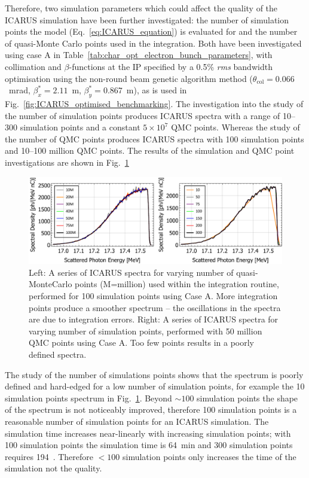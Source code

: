 \documentclass[../main.tex]{subfiles}
\begin{document}
Therefore, two simulation parameters which could affect the quality of the \textsc{ICARUS} simulation have been further investigated: the number of simulation points the model (Eq.~\ref{eq:ICARUS_equation}) is evaluated for and the number of quasi-Monte Carlo points used in the integration. Both have been investigated using case A  in Table~\ref{tab:char_opt_electron_bunch_parameters}, with collimation and $\beta$-functions at the IP specified by a 0.5\% \textit{rms} bandwidth optimisation using the non-round beam genetic algorithm method ($\theta_{\mathrm{col}}=0.066$~\si{\milli\radian}, $\beta_{x}^{*}=2.11$~\si{\meter}, $\beta_{y}^{*}=0.867$~\si{\meter}), as is used in Fig.~\ref{fig:ICARUS_optimised_benchmarking}. The investigation into the study of the number of simulation points produces \textsc{ICARUS} spectra with a range of 10--300 simulation points and a constant $5\times 10^{7}$ QMC points. Whereas the study of the number of QMC points produces \textsc{ICARUS} spectra with 100 simulation points and 10--100 million QMC points. The results of the simulation and QMC point investigations are shown in Fig.~\ref{fig:ICARUS_sim_qmc_points}

\begin{figure}[!h]
\centering
\includegraphics[width=\textwidth]{Figures/Optimisation_and_Characterisation_of_Inverse_Compton_Scattering_Sources/QMC_SIM_POINT_STUDY.pdf}
\caption{Left: A series of \textsc{ICARUS} spectra for varying number of quasi-MonteCarlo points (M=million) used within the integration routine, performed for 100 simulation points using Case A. More integration points produce a smoother spectrum -- the oscillations in the spectra are due to integration errors. Right: A series of \textsc{ICARUS} spectra for varying number of simulation points, performed with 50 million QMC points using Case A. Too few points results in a poorly defined spectra.}
\label{fig:ICARUS_sim_qmc_points}
\end{figure}

The study of the number of simulations points shows that the spectrum is poorly defined and hard-edged for a low number of simulation points, for example the 10 simulation points spectrum in Fig.~\ref{fig:ICARUS_sim_qmc_points}. Beyond $\sim 100$ simulation points the shape of the spectrum is not noticeably improved, therefore 100 simulation points is a reasonable number of simulation points for an \textsc{ICARUS} simulation. The simulation time increases near-linearly with increasing simulation points; with 100 simulation points the simulation time is 64~\si{\minute} and 300 simulation points requires 194~\si{\minutes}. Therefore $< 100$ simulation points only increases the time of the simulation not the quality.
\end{document}
